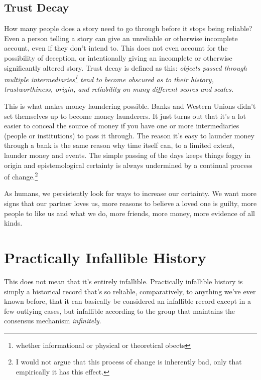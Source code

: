 \documentclass[a4paper,oneside]{article}
\begin{document}
\begin{multicols}{2}
\subsection{Trust Decay}

How many people does a story need to go through before it stops being reliable? Even a person telling a story can give an unreliable or otherwise incomplete account, even if they don't intend to. This does not even account for the possibility of deception, or intentionally giving an incomplete or otherwise significantly altered story. Trust decay is defined as this: \textit{objects passed through multiple intermediaries\footnote{whether informational or physical or theoretical obects} tend to become obscured as to their history, trustworthiness, origin, and reliability on many different scores and scales.}

This is what makes money laundering possible. Banks and Western Unions didn't set themselves up to become money launderers. It just turns out that it's a lot easier to conceal the source of money if you have one or more intermediaries (people or institutions) to pass it through. The reason it's easy to launder money through a bank is the same reason why time itself can, to a limited extent, launder money and events.  The simple passing of the days keeps things foggy in origin and epistemological certainty is always undermined by a continual process of change.\footnote{I would not argue that this process of change is inherently bad, only that empirically it has this effect.} 

As humans, we persistently look for ways to increase our certainty. We want more signs that our partner loves us, more reasons to believe a loved one is guilty, more people to like us and what we do, more friends, more money, more evidence of all kinds. 

\begin{tikzpicture}[]

\end{tikzpicture}

\section{Practically Infallible History}
This does not mean that it's entirely infallible. Practically infallible history is simply a historical record that's so reliable, comparatively, to anything we've ever known before, that it can basically be considered an infallible record except in a few outlying cases, but infallible according to the group that maintains the consensus mechanism \textit{infinitely}.


\end{multicols}
\end{document}
